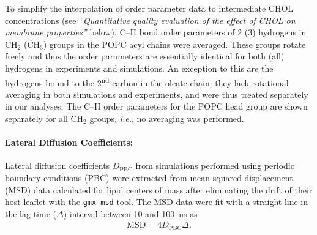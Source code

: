 \documentclass[journal=jctcce]{achemso}
\begin{document}
To simplify the interpolation of order parameter data to intermediate CHOL concentrations (see \textit{``Quantitative quality evaluation of the effect of CHOL on membrane properties''} below), C--H bond order parameters of 2 (3) hydrogens in CH$_2$ (CH$_3$) groups in the POPC acyl chains were averaged. These groups rotate freely and thus the order parameters are essentially identical for both (all) hydrogens in experiments and simulations. An exception to this are the hydrogens bound to the 2\textsuperscript{nd} carbon in the oleate chain; they lack rotational averaging in both simulations and experiments, and were thus treated separately in our analyses. The C--H order parameters for the POPC head group are shown separately for all CH$_2$ groups, \textit{i.e.}, no averaging was performed. 

\paragraph{Lateral Diffusion Coefficients:} Lateral diffusion coefficients $D_\mathrm{PBC}$ from simulations performed using periodic boundary conditions (PBC) were extracted from mean squared displacement (MSD) data calculated for lipid centers of mass after eliminating the drift of their host leaflet with the \texttt{gmx msd} tool. The MSD data were fit with a straight line in the lag time ($\Delta$) interval between 10 and 100~ns as
%
\begin{align}
	\mathrm{MSD}=4D_\mathrm{PBC}\Delta.
\end{align}
\end{document}
